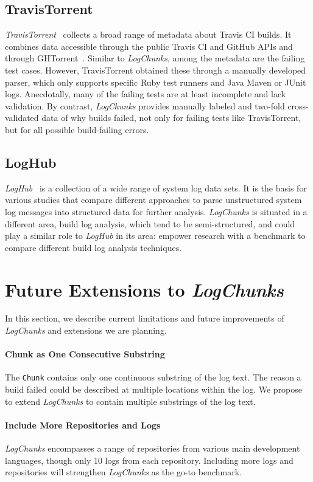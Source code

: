 \documentclass[sigconf]{acmart}
\newcommand{\logchunks}{\emph{LogChunks}\xspace}
\begin{document}
\subsection{TravisTorrent}
\emph{TravisTorrent}~\cite{beller2017travistorrent} collects a broad
range of metadata about Travis CI builds\@.  It combines data
accessible through the public Travis CI and GitHub APIs and through
GHTorrent~\cite{gousios2013ghtorrent}. Similar to \logchunks, among the
metadata are the failing test cases. However, TravisTorrent obtained
these through a manually developed parser, which only supports
specific Ruby test runners and Java Maven or JUnit logs. Anecdotally,
many of the failing tests are at least incomplete and lack
validation. By contrast, \logchunks provides manually labeled
and two-fold cross-validated data of why builds failed, not only for
failing tests like TravisTorrent, but for all possible build-failing
errors.

\subsection{LogHub}
\emph{LogHub}~\cite{zhu2019tools} is a collection of a wide range of system log data sets.
It is the basis for various studies that compare different approaches to parse unstructured system log messages into structured data for further analysis. \logchunks is situated in a different area, build log analysis, which tend to be semi-structured, and could play a similar role to \emph{LogHub} in its area: 
empower research with a benchmark to compare different build log analysis techniques.

\section{Future Extensions to \logchunks}

In this section, we describe current limitations and future improvements of \logchunks and extensions we are planning.

\paragraph{Chunk as One Consecutive Substring}
The \texttt{Chunk} contains only one continuous substring of the log text.
The reason a build failed could be described at multiple locations within the log.
We propose to extend \logchunks to contain multiple substrings of the log text.

\paragraph{Include More Repositories and Logs}
\logchunks encompasses a range of repositories from various main development languages, though only 10 logs from each repository.
Including more logs and repositories will strengthen \logchunks as the go-to benchmark.
\end{document}
